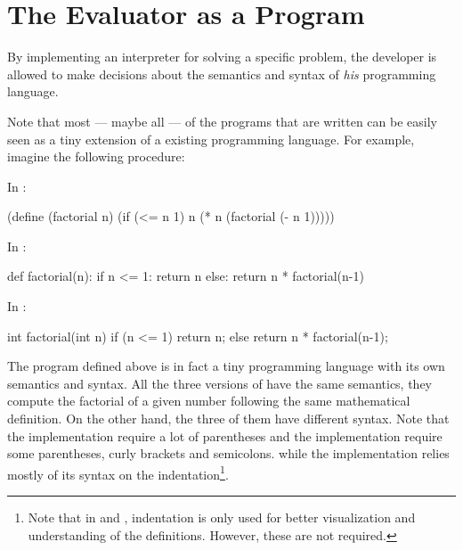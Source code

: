 \section{The Evaluator as a Program}
\label{section: The Evaluator as a Program}


  By implementing an interpreter for solving a specific problem, the developer is allowed to make decisions about the semantics and syntax of \emph{his} programming language.

  Note that most --- maybe all --- of the programs that are written can be easily seen as a tiny extension of a existing programming language. For example, imagine the following  procedure:

  \noindent
  \begin{minipage}[t]{0.37\textwidth}
    In :
    \begin{code}
(define (factorial n)
  (if (<= n 1)
      n
      (* n
         (factorial (- n
                       1)))))
    \end{code}
  \end{minipage}
  \hfill
  \begin{minipage}[t]{0.29\textwidth}
    In :
    \begin{code}
def factorial(n):
  if n <= 1:
    return n
  else:
    return n * factorial(n-1)
    \end{code}
  \end{minipage}
  \hfill
  \begin{minipage}[t]{0.32\textwidth}
    In :
    \begin{code}
int factorial(int n) {
  if (n <= 1) {
    return n;
  }
  else {
    return n * factorial(n-1);
  }
}
    \end{code}
  \end{minipage}

  The  program defined above is in fact a tiny programming language with its own semantics and syntax. All the three versions of  have the same semantics, they compute the factorial of a given number following the same mathematical definition. On the other hand, the three of them have different syntax. Note that the  implementation require a lot of parentheses and the  implementation require some parentheses, curly brackets and semicolons. while the  implementation relies mostly of its syntax on the indentation\footnote{Note that in  and , indentation is only used for better visualization and understanding of the definitions. However, these are not required.}.

